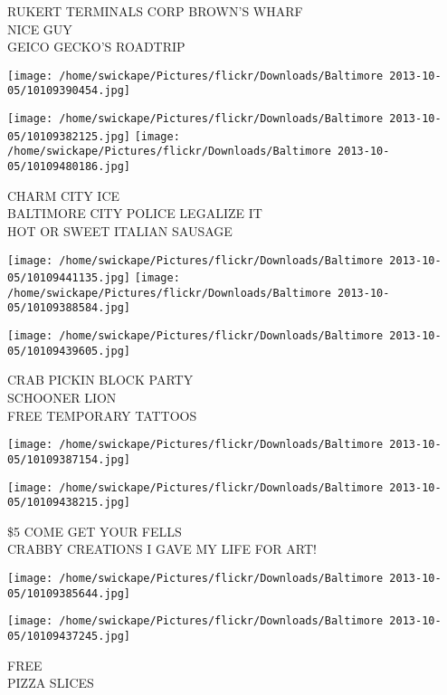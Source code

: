 \documentclass[10pt,letterpaper]{article}
\begin{document}
RUKERT TERMINALS CORP BROWN'S WHARF\\
NICE GUY\\
GEICO GECKO'S ROADTRIP\\
\pagebreak

\texttt{[image: /home/swickape/Pictures/flickr/Downloads/Baltimore 2013-10-05/10109390454.jpg]}

\vspace{0.25in}
\texttt{[image: /home/swickape/Pictures/flickr/Downloads/Baltimore 2013-10-05/10109382125.jpg]}
\texttt{[image: /home/swickape/Pictures/flickr/Downloads/Baltimore 2013-10-05/10109480186.jpg]}

CHARM CITY ICE\\
BALTIMORE CITY POLICE LEGALIZE IT\\
HOT OR SWEET ITALIAN SAUSAGE\\
\pagebreak

\texttt{[image: /home/swickape/Pictures/flickr/Downloads/Baltimore 2013-10-05/10109441135.jpg]}
\texttt{[image: /home/swickape/Pictures/flickr/Downloads/Baltimore 2013-10-05/10109388584.jpg]}

\texttt{[image: /home/swickape/Pictures/flickr/Downloads/Baltimore 2013-10-05/10109439605.jpg]}

CRAB PICKIN BLOCK PARTY\\
SCHOONER LION\\
FREE TEMPORARY TATTOOS\\
\pagebreak

\texttt{[image: /home/swickape/Pictures/flickr/Downloads/Baltimore 2013-10-05/10109387154.jpg]}

\vspace{0.25in}
\texttt{[image: /home/swickape/Pictures/flickr/Downloads/Baltimore 2013-10-05/10109438215.jpg]}

\$5 COME GET YOUR FELLS\\
CRABBY CREATIONS I GAVE MY LIFE FOR ART!\\
\pagebreak

\texttt{[image: /home/swickape/Pictures/flickr/Downloads/Baltimore 2013-10-05/10109385644.jpg]}

\vspace{0.25in}
\texttt{[image: /home/swickape/Pictures/flickr/Downloads/Baltimore 2013-10-05/10109437245.jpg]}

FREE\\
PIZZA SLICES\\
\pagebreak
\end{document}
